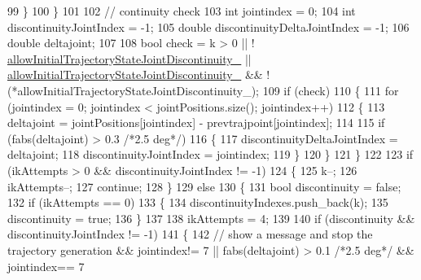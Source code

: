 \begin{DoxyCode}
99                     \}
100                 \}
101 
102                 \textcolor{comment}{// continuity check}
103                 \textcolor{keywordtype}{int} jointindex = 0;
104                 \textcolor{keywordtype}{int} discontinuityJointIndex = -1;
105                 \textcolor{keywordtype}{double} discontinuityDeltaJointIndex = -1;
106                 \textcolor{keywordtype}{double} deltajoint;
107 
108                 \textcolor{keywordtype}{bool} check = k > 0 || !
      \hyperlink{classcl__move__group__interface_1_1CbMoveEndEffectorTrajectory_a01e02533602d045538fd8ccc9a011ea7}{allowInitialTrajectoryStateJointDiscontinuity\_} || 
      \hyperlink{classcl__move__group__interface_1_1CbMoveEndEffectorTrajectory_a01e02533602d045538fd8ccc9a011ea7}{allowInitialTrajectoryStateJointDiscontinuity\_} && !
      (*allowInitialTrajectoryStateJointDiscontinuity\_);
109                 \textcolor{keywordflow}{if} (check)
110                 \{
111                     \textcolor{keywordflow}{for} (jointindex = 0; jointindex < jointPositions.size(); jointindex++)
112                     \{
113                         deltajoint = jointPositions[jointindex] - prevtrajpoint[jointindex];
114 
115                         \textcolor{keywordflow}{if} (fabs(deltajoint) > 0.3 \textcolor{comment}{/*2.5 deg*/})
116                         \{
117                             discontinuityDeltaJointIndex = deltajoint;
118                             discontinuityJointIndex = jointindex;
119                         \}
120                     \}
121                 \}
122 
123                 \textcolor{keywordflow}{if} (ikAttempts > 0 && discontinuityJointIndex != -1)
124                 \{
125                     k--;
126                     ikAttempts--;
127                     \textcolor{keywordflow}{continue};
128                 \}
129                 \textcolor{keywordflow}{else}
130                 \{
131                     \textcolor{keywordtype}{bool} discontinuity = \textcolor{keyword}{false};
132                     \textcolor{keywordflow}{if} (ikAttempts == 0)
133                     \{
134                         discontinuityIndexes.push\_back(k);
135                         discontinuity = \textcolor{keyword}{true};
136                     \}
137 
138                     ikAttempts = 4;
139 
140                     \textcolor{keywordflow}{if} (discontinuity && discontinuityJointIndex != -1)
141                     \{
142                         \textcolor{comment}{// show a message and stop the trajectory generation && jointindex!= 7 ||
       fabs(deltajoint) > 0.1 /*2.5 deg*/  && jointindex== 7}

\end{DoxyCode}
